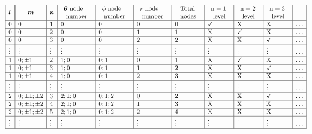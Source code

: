 \documentclass{article}
\begin{document}
$$
\begin{array}{|l|l|l|l|l|l|l|l|l|l|l|}
\hline \boldsymbol{l} & \multicolumn{1}{|c|}{\boldsymbol{m}} & \boldsymbol{n} & \begin{array}{l}
\boldsymbol{\theta} \text { node } \\
\text { number }
\end{array} & \begin{array}{l}
\phi \text { node } \\
\text { number }
\end{array} & \begin{array}{l}
r \text { node } \\
\text { number }
\end{array} & \begin{array}{l}
\text { Total } \\
\text { nodes }
\end{array} & \begin{array}{l}
\mathrm{n}=1 \\
\text { level }
\end{array} & \begin{array}{l}
\mathrm{n}=2 \\
\text { level }
\end{array} & \begin{array}{l}
\mathrm{n}=3 \\
\text { level }
\end{array} & \ldots \\
\hline 0 & 0 & 1 & 0 & 0 & 0 & 0 & \checkmark & \mathrm{X} & \mathrm{X} & \ldots \\
\hline 0 & 0 & 2 & 0 & 0 & 1 & 1 & \mathrm{X} & \checkmark & \mathrm{X} & \ldots \\
\hline 0 & 0 & 3 & 0 & 0 & 2 & 2 & \mathrm{X} & \mathrm{X} & \checkmark & \ldots \\
\hline \vdots & \vdots & \vdots & \vdots & \vdots & \vdots & \vdots & \vdots & \vdots & \vdots & \ldots \\
\hline 1 & 0 ; \pm 1 & 2 & 1 ; 0 & 0 ; 1 & 0 & 1 & \mathrm{X} & \checkmark & \mathrm{X} & \ldots \\
\hline 1 & 0 ; \pm 1 & 3 & 1 ; 0 & 0 ; 1 & 1 & 2 & \mathrm{X} & \mathrm{X} & \checkmark & \ldots \\
\hline 1 & 0 ; \pm 1 & 4 & 1 ; 0 & 0 ; 1 & 2 & 3 & \mathrm{X} & \mathrm{X} & \mathrm{X} & \ldots \\
\hline \vdots & \vdots & \vdots & \vdots & \vdots & \vdots & \vdots & \vdots & \vdots & \vdots & \ldots \\
\hline 2 & 0 ; \pm 1 ; \pm 2 & 3 & 2 ; 1 ; 0 & 0 ; 1 ; 2 & 0 & 2 & \mathrm{X} & \mathrm{X} & \checkmark & \ldots \\
\hline 2 & 0 ; \pm 1 ; \pm 2 & 4 & 2 ; 1 ; 0 & 0 ; 1 ; 2 & 1 & 3 & \mathrm{X} & \mathrm{X} & \mathrm{X} & \ldots \\
\hline 2 & 0 ; \pm 1 ; \pm 2 & 5 & 2 ; 1 ; 0 & 0 ; 1 ; 2 & 2 & 4 & \mathrm{X} & \mathrm{X} & \mathrm{X} & \ldots \\
\hline \vdots & \vdots & \vdots & \vdots & \vdots & \vdots & \vdots & \vdots & \vdots & \vdots & \ldots \\
\hline
\end{array}
$$
\end{document}
